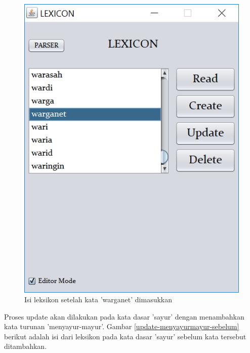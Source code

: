 \begin{figure}[H]
\centering
\includegraphics[scale=0.7]{Gambar/create-warganet-setelah}
\caption{Isi leksikon setelah kata 'warganet' dimasukkan} 
\label{create-warganet-setelah}
\end{figure}

Proses update akan dilakukan pada kata dasar 'sayur' dengan menambahkan kata turunan 'menyayur-mayur'. Gambar \ref{update-menyayurmayur-sebelum} berikut adalah isi dari leksikon pada kata dasar 'sayur' sebelum kata tersebut ditambahkan.

